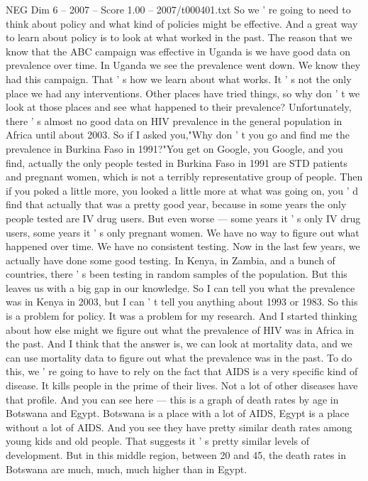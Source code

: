 \begin{textsample}{NEG Dim 6 – 2007 – Score 1.00 – 2007/t000401.txt}
So we ' re going to need to think about policy and what kind of policies might be effective.
And a great way to learn about policy is to look at what worked in the past.
The reason that we know that the ABC campaign was effective in Uganda is we have good data on prevalence over time.
In Uganda we see the prevalence went down.
We know they had this campaign.
That ' s how we learn about what works.
It ' s not the only place we had any interventions.
Other places have tried things, so why don ' t we look at those places and see what happened to their prevalence?
Unfortunately, there ' s almost no good data on HIV prevalence in the general population in Africa until about 2003.
So if I asked you,"Why don ' t you go and find me the prevalence in Burkina Faso in 1991?"You get on Google, you Google, and you find, actually the only people tested in Burkina Faso in 1991 are STD patients and pregnant women, which is not a terribly representative group of people.
Then if you poked a little more, you looked a little more at what was going on, you ' d find that actually that was a pretty good year, because in some years the only people tested are IV drug users.
But even worse — some years it ' s only IV drug users, some years it ' s only pregnant women.
We have no way to figure out what happened over time.
We have no consistent testing.
Now in the last few years, we actually have done some good testing.
In Kenya, in Zambia, and a bunch of countries, there ' s been testing in random samples of the population.
But this leaves us with a big gap in our knowledge.
So I can tell you what the prevalence was in Kenya in 2003, but I can ' t tell you anything about 1993 or 1983.
So this is a problem for policy.
It was a problem for my research.
And I started thinking about how else might we figure out what the prevalence of HIV was in Africa in the past.
And I think that the answer is, we can look at mortality data, and we can use mortality data to figure out what the prevalence was in the past.
To do this, we ' re going to have to rely on the fact that AIDS is a very specific kind of disease.
It kills people in the prime of their lives.
Not a lot of other diseases have that profile.
And you can see here — this is a graph of death rates by age in Botswana and Egypt.
Botswana is a place with a lot of AIDS, Egypt is a place without a lot of AIDS.
And you see they have pretty similar death rates among young kids and old people.
That suggests it ' s pretty similar levels of development.
But in this middle region, between 20 and 45, the death rates in Botswana are much, much, much higher than in Egypt.

\end{textsample}
